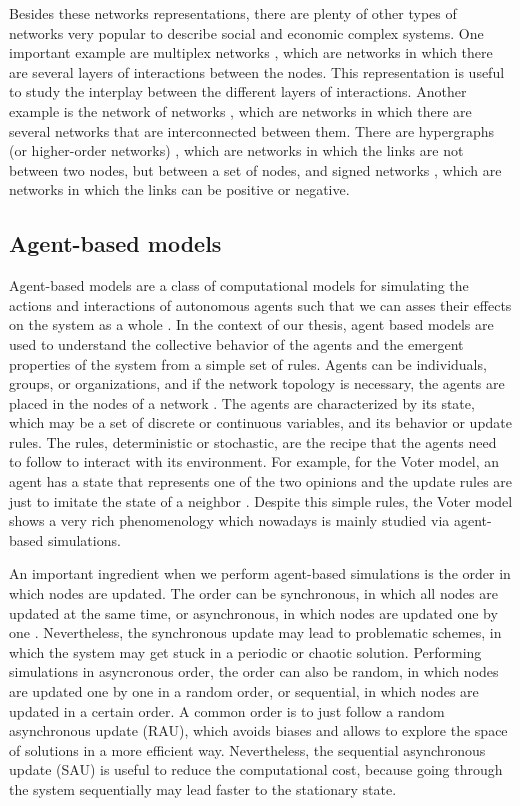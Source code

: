 Besides these networks representations, there are plenty of other types of networks very popular to describe social and economic complex systems. One important example are multiplex networks \cite{gomez-2013,kivela2014multilayer,de2013mathematical}, which are networks in which there are several layers of interactions between the nodes. This representation is useful to study the interplay between the different layers of interactions. Another example is the network of networks \cite{gao2011robustness, d2014networks}, which are networks in which there are several networks that are interconnected between them. There are hypergraphs (or higher-order networks) \cite{battiston-2021}, which are networks in which the links are not between two nodes, but between a set of nodes, and signed networks \cite{leskovec2010signed}, which are networks in which the links can be positive or negative. 


\subsection{\label{subsec:Agent-based models} Agent-based models}

Agent-based models are a class of computational models for simulating the actions and interactions of autonomous agents such that we can asses their effects on the system as a whole \cite{duffy-1998, bonabeau-2002}. In the context of our thesis, agent based models are used to understand the collective behavior of the agents and the emergent properties of the system from a simple set of rules. Agents can be individuals, groups, or organizations, and if the network topology is necessary, the agents are placed in the nodes of a network \cite{macal-2010, railsback-2011}. The agents are characterized by its state, which may be a set of  discrete or continuous variables, and its behavior or update rules. The rules, deterministic or stochastic, are the recipe that the agents need to follow to interact with its environment. For example, for the Voter model, an agent has a state that represents one of the two opinions and the update rules are just to imitate the state of a neighbor \cite{castellano2009statistical}. Despite this simple rules, the Voter model shows a very rich phenomenology which nowadays is mainly studied via agent-based simulations.

An important ingredient when we perform agent-based simulations is the order in which nodes are updated. The order can be synchronous, in which all nodes are updated at the same time, or asynchronous, in which nodes are updated one by one \cite{macal-2010, railsback-2011}. Nevertheless, the synchronous update may lead to problematic schemes, in which the system may get stuck in a periodic or chaotic solution. Performing simulations in asyncronous order, the order can also be random, in which nodes are updated one by one in a random order, or sequential, in which nodes are updated in a certain order. A common order is to just follow a random asynchronous update (RAU), which avoids biases and allows to explore the space of solutions in a more efficient way. Nevertheless, the sequential asynchronous update (SAU) is useful to reduce the computational cost, because going through the system sequentially may lead faster to the stationary state.

